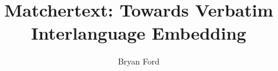 \documentclass[fullpage,twocolumn]{article}
\begin{document}
\title{Matchertext: Towards Verbatim Interlanguage Embedding}

\author{Bryan Ford}

\maketitle












\arxiv{

}{

}
\end{document}

